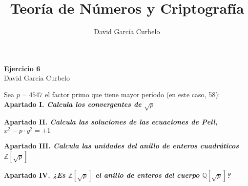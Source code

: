 \documentclass[fleqn]{article}
\author{David García Curbelo}
\title{Teoría de Números y Criptografía}
\def\Z{\mathds{Z}}
\def\Q{\mathds{Q}}
\begin{document}
    \begin{center}
        \LARGE{\textbf{Ejercicio 6}} \\
        \Large{David García Curbelo} \\
    \end{center}

    \vspace{1cm}
    
    Sea $p = 4547$ el factor primo que tiene mayor período (en este caso, 58): \\ 


    \textbf{Apartado I. \textit{Calcula los convergentes de $\sqrt{p}$}} 

    \newpage
    \textbf{Apartado II. \textit{Calcula las soluciones de las ecuaciones de Pell, $x^2 - p \cdot y^2 = \pm 1$}}


    \newpage
    \textbf{Apartado III. \textit{Calcula las unidades del anillo de enteros cuadráticos $\Z[\sqrt{p}]$}}


    \newpage
    \textbf{Apartado IV. \textit{¿Es $\Z[\sqrt{p}]$ el anillo de enteros del cuerpo $\Q[\sqrt{p}]$?}}
\end{document}
